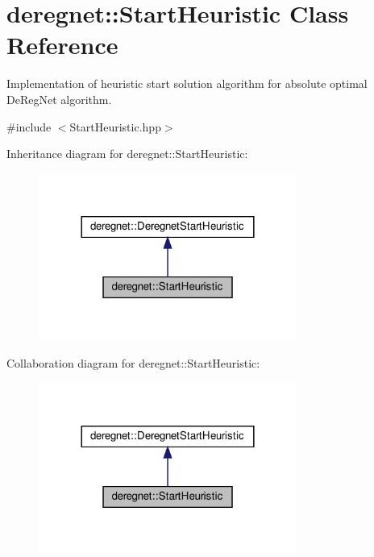 \hypertarget{classderegnet_1_1StartHeuristic}{}\section{deregnet\+:\+:Start\+Heuristic Class Reference}
\label{classderegnet_1_1StartHeuristic}


Implementation of heuristic start solution algorithm for absolute optimal De\+Reg\+Net algorithm.  




{\ttfamily \#include $<$Start\+Heuristic.\+hpp$>$}



Inheritance diagram for deregnet\+:\+:Start\+Heuristic\+:\nopagebreak
\begin{figure}[H]
\begin{center}
\leavevmode
\includegraphics[width=240pt]{classderegnet_1_1StartHeuristic__inherit__graph}
\end{center}
\end{figure}


Collaboration diagram for deregnet\+:\+:Start\+Heuristic\+:\nopagebreak
\begin{figure}[H]
\begin{center}
\leavevmode
\includegraphics[width=240pt]{classderegnet_1_1StartHeuristic__coll__graph}
\end{center}
\end{figure}
